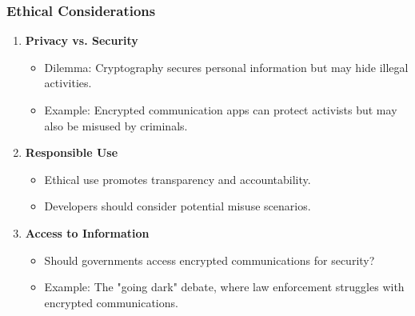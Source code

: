 \documentclass{beamer}
\begin{document}
\begin{frame}[fragile]
    \frametitle{Ethical Considerations}
    \begin{enumerate}
        \item \textbf{Privacy vs. Security}
            \begin{itemize}
                \item Dilemma: Cryptography secures personal information but may hide illegal activities.
                \item Example: Encrypted communication apps can protect activists but may also be misused by criminals.
            \end{itemize}

        \item \textbf{Responsible Use}
            \begin{itemize}
                \item Ethical use promotes transparency and accountability.
                \item Developers should consider potential misuse scenarios.
            \end{itemize}

        \item \textbf{Access to Information}
            \begin{itemize}
                \item Should governments access encrypted communications for security? 
                \item Example: The "going dark" debate, where law enforcement struggles with encrypted communications.
            \end{itemize}
    \end{enumerate}
\end{frame}
\end{document}
